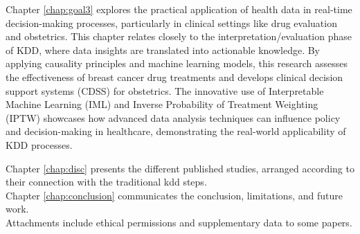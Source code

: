Chapter \ref{chap:goal3} explores the practical application of health data in real-time decision-making processes, particularly in clinical settings like drug evaluation and obstetrics. This chapter relates closely to the interpretation/evaluation phase of KDD, where data insights are translated into actionable knowledge. By applying causality principles and machine learning models, this research assesses the effectiveness of breast cancer drug treatments and develops clinical decision support systems (CDSS) for obstetrics. The innovative use of Interpretable Machine Learning (IML) and Inverse Probability of Treatment Weighting (IPTW) showcases how advanced data analysis techniques can influence policy and decision-making in healthcare, demonstrating the real-world applicability of KDD processes.


Chapter \ref{chap:disc}  presents the different published studies, arranged according to their connection with the traditional \ac{kdd} steps.\\

Chapter \ref{chap:conclusion} communicates the conclusion, limitations, and future work.\\

Attachments include ethical permissions and supplementary data to some papers.

